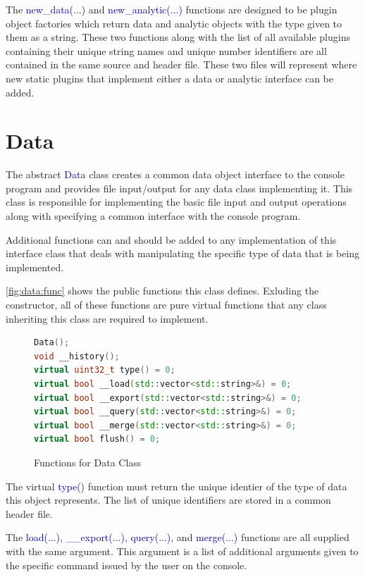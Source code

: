 \documentclass[10pt]{article}
\providecommand{\h}[1]{\textcolor{darkblue}{#1}}
\begin{document}
The \h{new\_data(...)} and \h{new\_analytic(...)} functions are designed to be 
plugin object factories which return data and analytic objects with the type 
given to them as a string. These two functions along with the list of all 
available plugins containing their unique string names and unique number 
identifiers are all contained in the same source and header file. These two 
files will represent where new static plugins that implement either a data or 
analytic interface can be added.

\newpage
\section{Data}

The abstract \h{Data} class creates a common data object interface to the 
console program and provides file input/output for any data class implementing 
it. This class is responsible for implementing the basic file input and output 
operations along with specifying a common interface with the console program.

Additional functions can and should be added to any implementation of this 
interface class that deals with manipulating the specific type of data that is 
being implemented.

\autoref{fig:data:func} shows the public functions this class defines. 
Exluding the constructor, all of these functions are pure virtual functions 
that any class inheriting this class are required to implement.

\begin{figure}[H]
\begin{mdframed}[style=functions]
\begin{lstlisting}[language=C++]
Data();
void __history();
virtual uint32_t type() = 0;
virtual bool __load(std::vector<std::string>&) = 0;
virtual bool __export(std::vector<std::string>&) = 0;
virtual bool __query(std::vector<std::string>&) = 0;
virtual bool __merge(std::vector<std::string>&) = 0;
virtual bool flush() = 0;
\end{lstlisting}
\end{mdframed}
\caption{Functions for Data Class}
\label{fig:data:func}
\end{figure}

The virtual \h{type()} function must return the unique identier of the type of 
data this object represents. The list of unique identifiers are stored in a 
common header file.

The \h{load(...)}, \h{\_\_export(...)}, \h{query(...)}, and \h{merge(...)} 
functions are all supplied with the same argument. This argument is a list of 
additional arguments given to the specific command issued by the user on the 
console.
\end{document}
